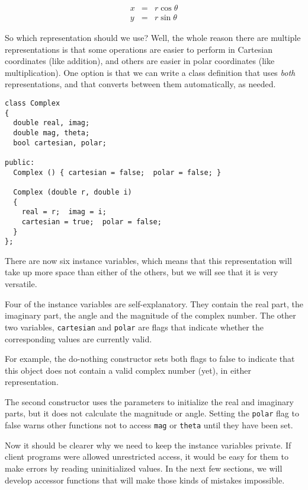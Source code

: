 \begin{eqnarray*}
x       & = &  r \cos \theta \\
y       & = &  r \sin \theta
\end{eqnarray*}

So which representation should we use?  Well, the whole reason there
are multiple representations is that some operations are easier to
perform in Cartesian coordinates (like addition), and others are
easier in polar coordinates (like multiplication).  One option is that
we can write a class definition that uses {\em both} representations,
and that converts between them automatically, as needed.

\begin{verbatim}
class Complex
{
  double real, imag;
  double mag, theta;
  bool cartesian, polar;

public:
  Complex () { cartesian = false;  polar = false; }

  Complex (double r, double i)
  {
    real = r;  imag = i;
    cartesian = true;  polar = false;
  }
};
\end{verbatim}
%
There are now six instance variables, which means that
this representation will take up more space than either
of the others, but we will see that it is very versatile.


Four of the instance variables are self-explanatory.  They
contain the real part, the imaginary part, the angle and
the magnitude of the complex number.  The other two
variables, {\tt cartesian} and {\tt polar} are flags that
indicate whether the corresponding values are currently
valid.


For example, the do-nothing constructor sets both flags
to false to indicate that this object does not contain
a valid complex number (yet), in either representation.

The second constructor uses the parameters to initialize
the real and imaginary parts, but it does not calculate the
magnitude or angle.  Setting the {\tt polar} flag to false
warns other functions not to access {\tt mag} or {\tt theta}
until they have been set.

Now it should be clearer why we need to keep the instance
variables private.  If client programs were allowed unrestricted
access, it would be easy for them to make errors by reading
uninitialized values.  In the next few sections, we will
develop accessor functions that will make those kinds of mistakes
impossible.

